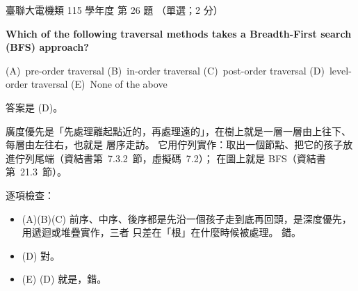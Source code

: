 \begin{pastexam}[label={px:ust-115-ee-ds-26}]{臺聯大電機類 115 學年度 第 26 題}
（單選；2 分）

\textbf{Which of the following traversal methods takes a Breadth-First search (BFS) approach?}

(A)~pre-order traversal \qquad (B)~in-order traversal \qquad (C)~post-order traversal \qquad
(D)~level-order traversal \qquad (E)~None of the above
\end{pastexam}

\begin{pastsoln}
答案是 (D)。

廣度優先是「先處理離起點近的，再處理遠的」，在樹上就是一層一層由上往下、每層由左往右，也就是
層序走訪。 它用佇列實作：取出一個節點、把它的孩子放進佇列尾端（資結書第~7.3.2~節，虛擬碼~7.2）；
在圖上就是 BFS（資結書第~21.3~節）。

逐項檢查：
\begin{itemize}
\item (A)(B)(C) 前序、中序、後序都是先沿一個孩子走到底再回頭，是深度優先，用遞迴或堆疊實作，三者
只差在「根」在什麼時候被處理。 錯。
\item (D) 對。
\item (E) (D) 就是，錯。
\end{itemize}
\end{pastsoln}
